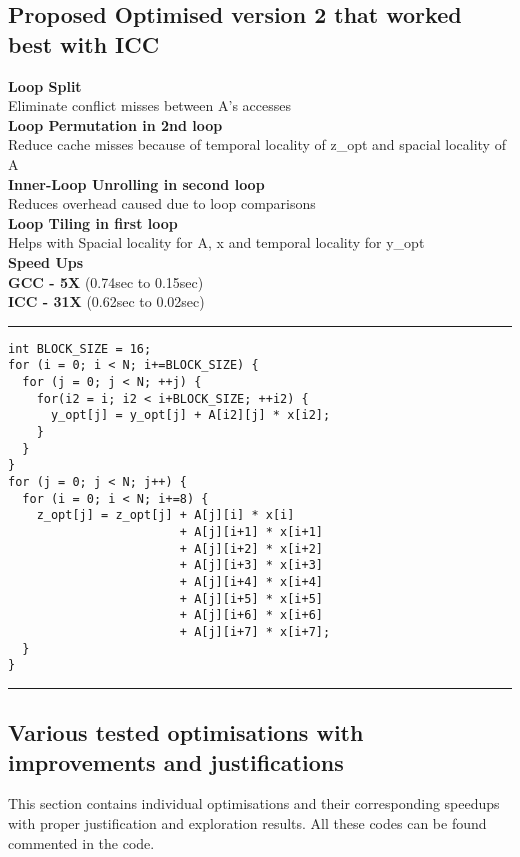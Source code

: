 \documentclass[a4paper]{article}
\begin{document}
\newpage


\subsection{Proposed Optimised version 2 that worked best with ICC}
\begin{minipage}{0.4\textwidth}

{\bf Loop Split} \\
Eliminate conflict misses between A's accesses \\ 

{\bf Loop Permutation in 2nd loop} \\
Reduce cache misses because of temporal locality of z\_opt and spacial locality of A \\ 

{\bf Inner-Loop Unrolling in second loop} \\
Reduces overhead caused due to loop comparisons \\ 

{\bf Loop Tiling in first loop} \\
Helps with Spacial locality for A, x and temporal locality for y\_opt \\ 

{\bf Speed Ups } \\
{\bf GCC - 5X} (0.74sec to 0.15sec) \\
{\bf ICC - 31X} (0.62sec to 0.02sec) \\

\end{minipage}
\begin{minipage}{0.6\textwidth}
\hrule
\begin{lstlisting}
int BLOCK_SIZE = 16;
for (i = 0; i < N; i+=BLOCK_SIZE) {
  for (j = 0; j < N; ++j) {
    for(i2 = i; i2 < i+BLOCK_SIZE; ++i2) {
      y_opt[j] = y_opt[j] + A[i2][j] * x[i2];
    }
  }
}
for (j = 0; j < N; j++) {
  for (i = 0; i < N; i+=8) {
    z_opt[j] = z_opt[j] + A[j][i] * x[i]
                        + A[j][i+1] * x[i+1]
                        + A[j][i+2] * x[i+2]
                        + A[j][i+3] * x[i+3]
                        + A[j][i+4] * x[i+4]
                        + A[j][i+5] * x[i+5]
                        + A[j][i+6] * x[i+6]
                        + A[j][i+7] * x[i+7];
  }
}
\end{lstlisting}
\hrule 
\end{minipage}
\vspace{0.2cm}


\subsection{Various tested optimisations with improvements and justifications}
This section contains individual optimisations and their corresponding speedups with proper justification and exploration results. All these codes can be found commented in the code. 
\end{document}
